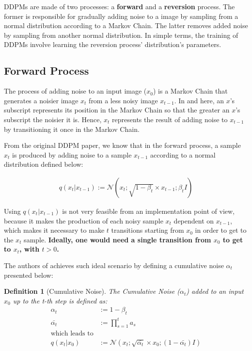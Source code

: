 \documentclass{article}
\newtheorem{definition}{Definition}[section]
\begin{document}
DDPMs are made of two processes: a \textbf{forward} and a \textbf{reversion} process. The former is responsible for gradually adding noise to a  image by sampling from a normal distribution according to a Markov Chain. The latter removes  added noise by sampling from another normal distribution. In simple terms, the training of DDPMs involve learning the reversion process' distribution's parameters.


\subsection{Forward Process}

The process of adding noise to an input image ($x_0$) is a Markov Chain that generates a noisier image $x_t$ from a less noisy image $x_{t-1}$. In \cite{DBLP:journals/corr/abs-2006-11239} and here, an $x$'s  subscript represents its position in the Markov Chain so that the greater an $x$'s  subscript the noisier it is. Hence, $x_t$ represents the result of adding noise to $x_{t-1}$ by transitioning it once in the Markov Chain.


From the original DDPM paper, we know that in the forward process, a sample $x_t$ is produced by adding noise to a sample $x_{t-1}$ according to a normal distribution defined below:

\begin{align}
	q(x_t|x_{t-1}) := \mathcal{N}(x_{t}; \sqrt{1-\beta_t} \times x_{t-1}; \beta_tI)
\end{align}


Using $q(x_t|x_{t-1})$  is not very feasible from an implementation point of view, because it makes the production of each noisy sample $x_{t}$ dependent on $x_{t-1}$, which makes it necessary to make $t$ transitions starting from $x_0$ in order to get to the $x_t$ sample. \textbf{Ideally, one would need a single transition from $x_0$  to get to $x_t$, with $t>0$.}

The authors of \cite{DBLP:journals/corr/abs-2006-11239} achieves such ideal scenario by defining a cumulative noise $\alpha_t$ presented below:

\begin{definition}[Cumulative Noise]
	The Cumulative Noise ($\alpha_t$) added to an input  $x_0$ up to the t-th step is defined as:
		\label{def:cum_noise}
	\begin{align}
		\alpha_t &:= 1 - \beta_t \\
		\bar{\alpha_t} &:= \prod_{s=1}^{t} a_s \\
		\text{which leads to}\\
		q(x_t|x_0) &:= \mathcal{N}(x_{t}; \sqrt{\bar{\alpha_t}} \times x_0; (1 - \bar{\alpha_t})I)
	\end{align}
\end{definition}
\end{document}
